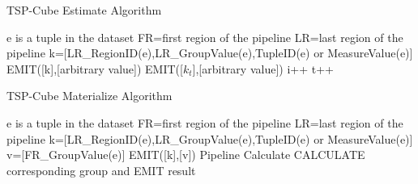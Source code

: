{\renewcommand\baselinestretch{1} 
\begin{algorithm}
\caption{TSP-Cube Estimate Algorithm}
\label{tscube_mr1}
{\fontfamily{\familydefault}\selectfont

	\begin{algorithmic}[1] %
    	\State e is a tuple in the dataset
    		\State FR=first region of the pipeline
    		\State LR=last region of the pipeline
        	\State k=[LR\_RegionID(e),LR\_GroupValue(e),TupleID(e) or MeasureValue(e)]
        	\State EMIT([k],[arbitrary value])
        \EndFor
   	 \EndFunction
   	 \State
     		 \State	
     		 EMIT([${k}_{t}$],[arbitrary value]) 
     		 \State i++
     		\EndIf
     		\State t++
     	\EndWhile
     \EndFunction
	\end{algorithmic}	
}
\end{algorithm}



\begin{algorithm}
\caption{TSP-Cube Materialize Algorithm}
\label{tscube_mr2}
{\fontfamily{\familydefault}\selectfont

	\begin{algorithmic}[1] %
    	\State e is a tuple in the dataset
    		\State FR=first region of the pipeline
    		\State LR=last region of the pipeline
        	\State k=[LR\_RegionID(e),LR\_GroupValue(e),TupleID(e) or MeasureValue(e)]
        	\State v=[FR\_GroupValue(e)]
        	\State EMIT([k],[v])
        \EndFor
   	 \EndFunction
   	 \State
     	\State Pipeline Calculate 
     			\State
     			CALCULATE corresponding group and EMIT result
     		\EndIf
     	\EndFor
     \EndFunction
	\end{algorithmic}	
}
\end{algorithm}





\par}









